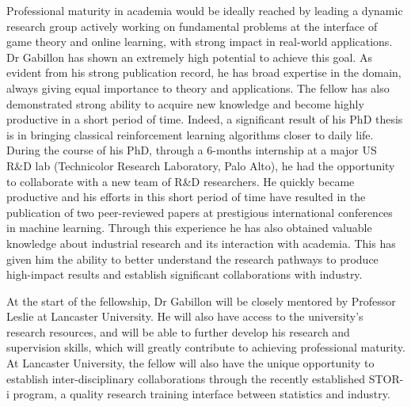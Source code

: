 Professional maturity in academia would be ideally reached by leading a dynamic research group actively working on fundamental problems at the interface of game theory and online learning, with strong impact in real-world applications. Dr Gabillon has shown an extremely high potential to achieve this goal. As evident from his strong publication record, he has broad expertise in the domain, always giving equal importance to theory and applications. The fellow has also demonstrated strong ability to acquire new knowledge  and become highly productive in a short period of time. Indeed, a significant result of his PhD thesis is in bringing classical reinforcement learning algorithms closer to daily life. 
During the course of his PhD, through a 6-months internship at a major US R\&D lab (Technicolor Research Laboratory, Palo Alto), he had the opportunity to collaborate with a new team of R\&D researchers. He quickly became productive and his efforts in this short period of time have resulted in the publication of two peer-reviewed papers at prestigious international conferences in machine learning. Through this experience he has also obtained valuable knowledge about industrial research and its interaction with academia. This has given him the ability to better understand the research pathways to produce high-impact results and establish significant collaborations with industry.

At the start of the fellowship, Dr Gabillon will be closely mentored by Professor Leslie at Lancaster University. He will also have access to the university's research resources, and will be able to further develop his research and supervision skills, which will greatly contribute to achieving professional maturity. At Lancaster University, the fellow will also have the unique opportunity to establish inter-disciplinary collaborations through the recently established STOR-i program, a quality research training interface between statistics and industry. 